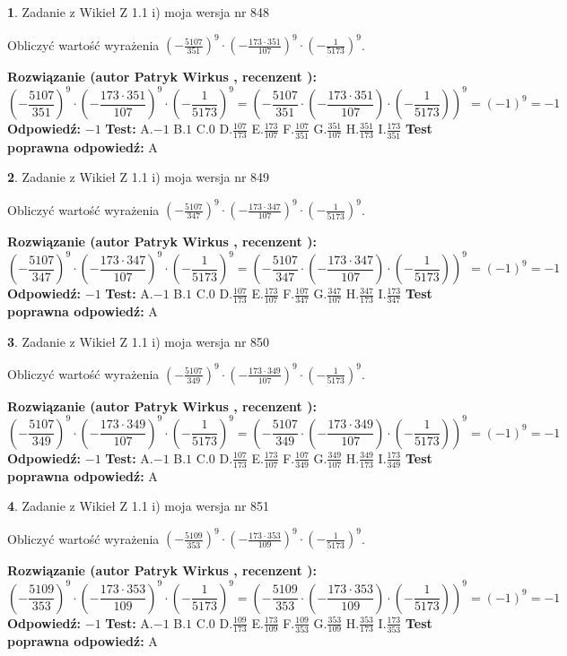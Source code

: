 \documentclass[12pt, a4paper]{article}
\theoremstyle{definition} %
\newtheorem{zad}{}
\newcommand{\zadStart}[1]{\begin{zad}#1\newline}
\newcommand{\zadStop}{\end{zad}}
\newcommand{\rozwStart}[2]{\noindent \textbf{Rozwiązanie (autor #1 , recenzent #2): }\newline}
\newcommand{\rozwStop}{\newline}
\newcommand{\odpStart}{\noindent \textbf{Odpowiedź:}\newline}
\newcommand{\odpStop}{\newline}
\newcommand{\testStart}{\noindent \textbf{Test:}\newline}
\newcommand{\testStop}{\newline}
\newcommand{\kluczStart}{\noindent \textbf{Test poprawna odpowiedź:}\newline}
\newcommand{\kluczStop}{\newline}
\begin{document}
\zadStart{Zadanie z Wikieł Z 1.1 i) moja wersja nr 848}

Obliczyć wartość wyrażenia $(-\frac{5107}{351})^{9} \cdot (-\frac{173 \cdot 351}{107})^{9} \cdot (-\frac{1}{5173})^{9}$.
\zadStop
\rozwStart{Patryk Wirkus}{}
$$(-\frac{5107}{351})^{9} \cdot (-\frac{173 \cdot 351}{107})^{9} \cdot (-\frac{1}{5173})^{9} = (-\frac{5107}{351} \cdot (-\frac{173 \cdot 351}{107}) \cdot (-\frac{1}{5173}))^{9} = (-1)^{9} = -1$$
\rozwStop
\odpStart
$-1$
\odpStop
\testStart
A.$-1$ B.$1$ C.$0$ D.$\frac{107}{173}$ E.$\frac{173}{107}$
F.$\frac{107}{351}$ G.$\frac{351}{107}$
H.$\frac{351}{173}$
I.$\frac{173}{351}$
\testStop
\kluczStart
A
\kluczStop



\zadStart{Zadanie z Wikieł Z 1.1 i) moja wersja nr 849}

Obliczyć wartość wyrażenia $(-\frac{5107}{347})^{9} \cdot (-\frac{173 \cdot 347}{107})^{9} \cdot (-\frac{1}{5173})^{9}$.
\zadStop
\rozwStart{Patryk Wirkus}{}
$$(-\frac{5107}{347})^{9} \cdot (-\frac{173 \cdot 347}{107})^{9} \cdot (-\frac{1}{5173})^{9} = (-\frac{5107}{347} \cdot (-\frac{173 \cdot 347}{107}) \cdot (-\frac{1}{5173}))^{9} = (-1)^{9} = -1$$
\rozwStop
\odpStart
$-1$
\odpStop
\testStart
A.$-1$ B.$1$ C.$0$ D.$\frac{107}{173}$ E.$\frac{173}{107}$
F.$\frac{107}{347}$ G.$\frac{347}{107}$
H.$\frac{347}{173}$
I.$\frac{173}{347}$
\testStop
\kluczStart
A
\kluczStop



\zadStart{Zadanie z Wikieł Z 1.1 i) moja wersja nr 850}

Obliczyć wartość wyrażenia $(-\frac{5107}{349})^{9} \cdot (-\frac{173 \cdot 349}{107})^{9} \cdot (-\frac{1}{5173})^{9}$.
\zadStop
\rozwStart{Patryk Wirkus}{}
$$(-\frac{5107}{349})^{9} \cdot (-\frac{173 \cdot 349}{107})^{9} \cdot (-\frac{1}{5173})^{9} = (-\frac{5107}{349} \cdot (-\frac{173 \cdot 349}{107}) \cdot (-\frac{1}{5173}))^{9} = (-1)^{9} = -1$$
\rozwStop
\odpStart
$-1$
\odpStop
\testStart
A.$-1$ B.$1$ C.$0$ D.$\frac{107}{173}$ E.$\frac{173}{107}$
F.$\frac{107}{349}$ G.$\frac{349}{107}$
H.$\frac{349}{173}$
I.$\frac{173}{349}$
\testStop
\kluczStart
A
\kluczStop



\zadStart{Zadanie z Wikieł Z 1.1 i) moja wersja nr 851}

Obliczyć wartość wyrażenia $(-\frac{5109}{353})^{9} \cdot (-\frac{173 \cdot 353}{109})^{9} \cdot (-\frac{1}{5173})^{9}$.
\zadStop
\rozwStart{Patryk Wirkus}{}
$$(-\frac{5109}{353})^{9} \cdot (-\frac{173 \cdot 353}{109})^{9} \cdot (-\frac{1}{5173})^{9} = (-\frac{5109}{353} \cdot (-\frac{173 \cdot 353}{109}) \cdot (-\frac{1}{5173}))^{9} = (-1)^{9} = -1$$
\rozwStop
\odpStart
$-1$
\odpStop
\testStart
A.$-1$ B.$1$ C.$0$ D.$\frac{109}{173}$ E.$\frac{173}{109}$
F.$\frac{109}{353}$ G.$\frac{353}{109}$
H.$\frac{353}{173}$
I.$\frac{173}{353}$
\testStop
\kluczStart
A
\kluczStop
\end{document}
